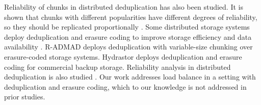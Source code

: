 Reliability of chunks in distributed deduplication has also been studied. It
is shown that chunks with different popularities have different degrees of
reliability, so they should be replicated proportionally
\cite{bhagwat06,Bhagwat09}.  Some distributed storage systems deploy
deduplication and erasure coding to improve storage efficiency and data
availability \cite{liu09,nam11,dubnicki09}. 
R-ADMAD \cite{liu09} deploys deduplication with variable-size chunking over
erasure-coded storage systems.  Hydrastor \cite{dubnicki09} deploys
deduplication and erasure coding for commercial backup storage.  Reliability
analysis in distributed deduplication is also studied \cite{nam11}.  Our work
addresses load balance in a setting with deduplication and erasure coding,
which to our knowledge is not addressed in prior studies. 


